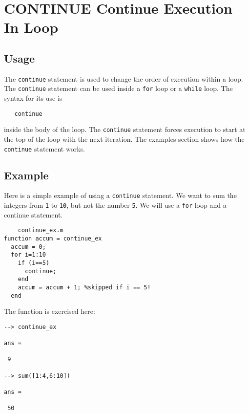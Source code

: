 \section{CONTINUE Continue Execution In Loop}

\subsection{Usage}

The \verb|continue| statement is used to change the order of
execution within a loop.  The \verb|continue| statement can
be used inside a \verb|for| loop or a \verb|while| loop.  The
syntax for its use is 
\begin{verbatim}
   continue
\end{verbatim}
inside the body of the loop.  The \verb|continue| statement
forces execution to start at the top of the loop with
the next iteration.  The examples section shows how
the \verb|continue| statement works.
\subsection{Example}

Here is a simple example of using a \verb|continue| statement.
We want to sum the integers from \verb|1| to \verb|10|, but not
the number \verb|5|.  We will use a \verb|for| loop and a continue
statement.
\begin{verbatim}
    continue_ex.m
function accum = continue_ex
  accum = 0;
  for i=1:10
    if (i==5)
      continue;
    end
    accum = accum + 1; %skipped if i == 5!
  end
\end{verbatim}
The function is exercised here:
\begin{verbatim}
--> continue_ex

ans = 

 9 

--> sum([1:4,6:10])

ans = 

 50 
\end{verbatim}
